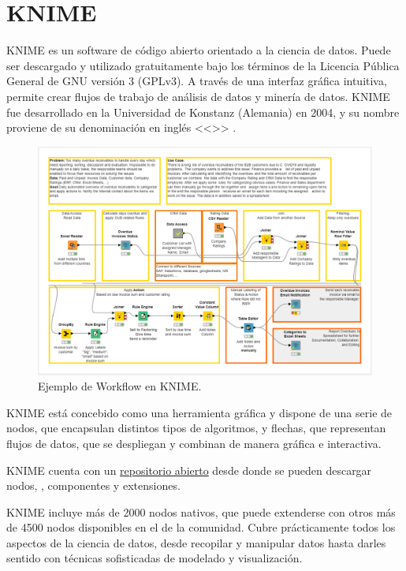 
\section{KNIME}

KNIME es un software de código abierto orientado a la ciencia de datos. Puede ser descargado y utilizado gratuitamente bajo los términos de la Licencia Pública General de GNU versión 3 (GPLv3). A través de una interfaz gráfica intuitiva, 
permite crear flujos de trabajo de análisis de datos y minería de datos. KNIME fue desarrollado en la Universidad de 
Konstanz (Alemania) en 2004, y su nombre proviene de su denominación en inglés <<>>\cite{BCDG+07} \cite{knime-whitepaper}. 
\

\begin{figure}[!h]
	\centering
	\includegraphics[width=1\textwidth]{img/3_ejemplo_workflow_knime.png}
	\caption{Ejemplo de Workflow en KNIME.}
	\label{fig:ejemploworkflow}
\end{figure}
\FloatBarrier

KNIME está concebido como una herramienta gráfica y dispone de una serie de nodos, que encapsulan distintos tipos de
 algoritmos, y flechas, que representan flujos de datos, que se despliegan y combinan de manera gráfica e interactiva.
\

KNIME cuenta con un \href{https://hub.knime.com/}{repositorio abierto} desde donde se pueden descargar nodos, , componentes y extensiones. 
\

KNIME incluye más de 2000 nodos nativos, que puede extenderse con otros más de 4500 nodos disponibles en el  
de la comunidad. Cubre prácticamente todos los aspectos de la ciencia de datos, desde recopilar y manipular 
datos hasta darles sentido con técnicas sofisticadas de modelado y visualización.
\

